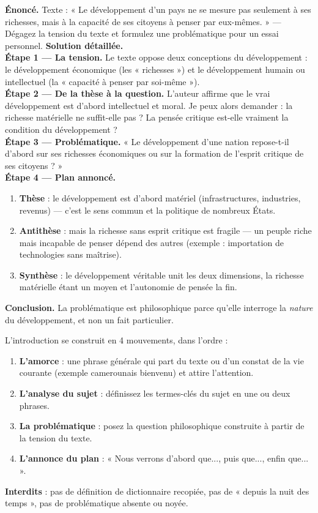 \documentclass[11pt]{article}
\newcommand{\cle}[1]{{\popxbold\color{popdark}#1}}
\begin{document}
\begin{exoresolu}
\textbf{Énoncé.} Texte : « Le développement d'un pays ne se mesure pas seulement à ses richesses, mais à la capacité de ses citoyens à penser par eux-mêmes. » — Dégagez la tension du texte et formulez une problématique pour un essai personnel.
\tcblower
\textbf{Solution détaillée.}\\
\textbf{Étape 1 — La tension.} Le texte oppose deux conceptions du \cle{développement} : le développement économique (les « richesses ») et le développement humain ou intellectuel (la « capacité à penser par soi-même »).\\
\textbf{Étape 2 — De la thèse à la question.} L'auteur affirme que le vrai développement est d'abord intellectuel et moral. Je peux alors demander : la richesse matérielle ne suffit-elle pas ? La pensée critique est-elle vraiment la condition du développement ?\\
\textbf{Étape 3 — Problématique.} « Le développement d'une nation repose-t-il d'abord sur ses richesses économiques ou sur la formation de l'esprit critique de ses citoyens ? »\\
\textbf{Étape 4 — Plan annoncé.}
\begin{enumerate}
\item \textbf{Thèse} : le développement est d'abord matériel (infrastructures, industries, revenus) — c'est le sens commun et la politique de nombreux États.
\item \textbf{Antithèse} : mais la richesse sans esprit critique est fragile — un peuple riche mais incapable de penser dépend des autres (exemple : importation de technologies sans maîtrise).
\item \textbf{Synthèse} : le développement véritable unit les deux dimensions, la richesse matérielle étant un moyen et l'autonomie de pensée la fin.
\end{enumerate}
\textbf{Conclusion.} La problématique est philosophique parce qu'elle interroge la \emph{nature} du développement, et non un fait particulier.
\end{exoresolu}

\begin{methode}
L'introduction se construit en 4 mouvements, dans l'ordre :
\begin{enumerate}
\item \textbf{L'amorce} : une phrase générale qui part du texte ou d'un constat de la vie courante (exemple camerounais bienvenu) et attire l'attention.
\item \textbf{L'analyse du sujet} : définissez les termes-clés du sujet en une ou deux phrases.
\item \textbf{La problématique} : posez la question philosophique construite à partir de la tension du texte.
\item \textbf{L'annonce du plan} : « Nous verrons d'abord que..., puis que..., enfin que... ».
\end{enumerate}
\textbf{Interdits} : pas de définition de dictionnaire recopiée, pas de « depuis la nuit des temps », pas de problématique absente ou noyée.
\end{methode}
\end{document}
